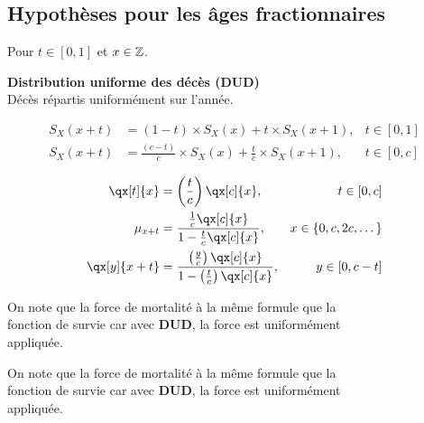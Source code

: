 \documentclass[10pt, french]{article}
\begin{document}
\begin{multicols*}{3}
\subsection{Hypothèses pour les âges fractionnaires}
Pour $t \in [0,1]$ et $x \in \mathbb{Z}$.

\textbf{Distribution uniforme des décès (DUD)} \\
Décès répartis uniformément sur l'année.

\begin{align*}
S_X(x + t) &= (1 - t) \times S_X(x) + t \times S_X(x + 1),  &t \in [0, 1] \\
S_X(x + t) &= \frac{(c - t)}{c} \times S_X(x) + \frac{t}{c} \times S_X(x + 1),  &t \in [0, c] \\
\end{align*}
\begin{align*}
\qx[t]{x} &= \left(\frac{t}{c}\right) \qx[c]{x},  &t \in [0, c] \\
\mu_{x + t} &= \frac{\frac{1}{c} \qx[c]{x}}{1 - \frac{t}{c} \qx[c]{x}}, &x \in \{0, c, 2c, \dots\} \\
\qx[y]{x + t} &= \frac{\left(\frac{y}{c}\right) \qx[c]{x}}{1 -\left(\frac{t}{c}\right) \qx[c]{x}}, &y \in [0, c - t] 
\end{align*}

On note que la force de mortalité à la même formule que la \\ fonction de survie car avec \textbf{DUD}, la force est uniformément \\ appliquée.

On note que la force de mortalité à la même formule que la \\ fonction de survie car avec \textbf{DUD}, la force est uniformément \\ appliquée.


\end{multicols*}
\end{document}
